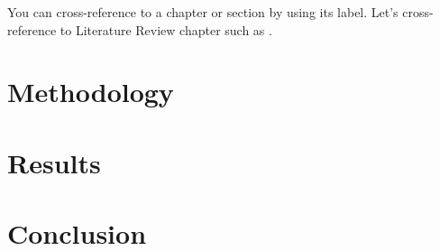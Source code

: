 \documentclass{template}
\begin{document}
You can cross-reference to a chapter or section by using its label. Let's cross-reference to Literature Review chapter such as .

\chapter{Methodology}\label{ch:me}
\chapter{Results}\label{ch:re}
\chapter{Conclusion}\label{ch:co}

\appendix %
\end{document}
